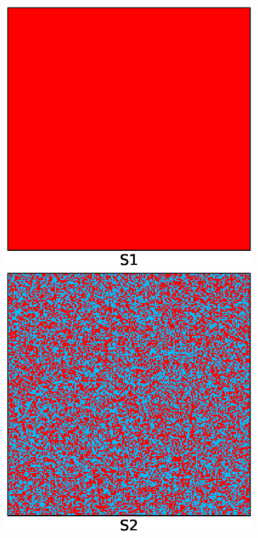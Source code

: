\begin{figure}[hbtp]
    \hfill
    \begin{minipage}[c]{0.45\textwidth}
        \centering 
        \includegraphics[scale=0.45]{images/ising/mixing_S1_before}
    \end{minipage}
    \hfill
    \begin{minipage}[c]{0.45\textwidth}
        \centering 
        \includegraphics[scale=0.45]{images/ising/mixing_S2_before}

\end{minipage}
\end{figure}
